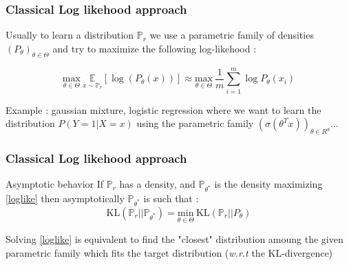 \documentclass[french,9pt]{beamer}
\begin{document}
\begin{frame}
\frametitle{Classical Log likehood approach}

Usually to learn a distribution $\mathbb{P}_{r}$ we use a parametric family of densities $(P_{\theta})_{\theta \in \Theta}$ and try to maximize the following log-likehood  :

\begin{equation}
\label{loglike}
 \underset{\theta \in \Theta}{\text{max}} \ \underset{x \sim \mathbb{P}_{r} }{\mathbb{E}}[\log(P_{\theta}(x))] \approx \underset{\theta \in \Theta}{\text{max}} \ \frac{1}{m} \sum_{i=1}^{m} \log P_{\theta}(x_{i})
 \end{equation}

Example : gaussian mixture, logistic regression where we want to learn the distribution $P(Y=1|X=x)$ using the parametric family $(\sigma(\theta^{T} x))_{\theta \in R^{d}}$...

\begin{center}
\end{center}

\end{frame}

\begin{frame}
\frametitle{Classical Log likehood approach}

\begin{block}{Asymptotic behavior}
If $\mathbb{P}_{r}$ has a density, and $\mathbb{P}_{\theta^{*}}$ is the density maximizing \eqref{loglike} then asymptotically $\mathbb{P}_{\theta^{*}}$ is such that : 
$$\text{KL}(\mathbb{P}_{r}||\mathbb{P}_{\theta^{*}})= \underset{\theta \in \Theta}{\text{min}} \ \text{KL}(\mathbb{P}_{r}||P_{\theta})$$

Solving \eqref{loglike} is equivalent to find the "closest" distribution amoung the given parametric family which fits the target distribution (\textit{w.r.t} the KL-divergence)
\end{block}


\end{frame}
\end{document}
